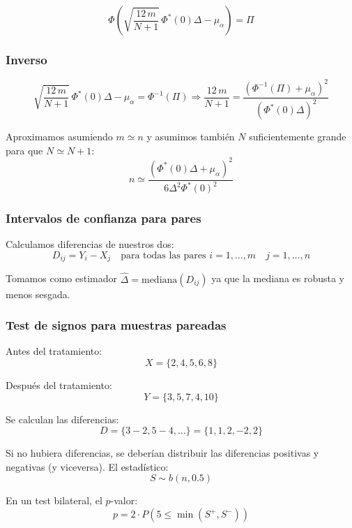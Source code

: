 \[
\Phi\left(\sqrt{\frac{12 \, m}{N+1}} \, \Phi^*(0) \Delta - \mu_\alpha\right) = \Pi
\]

\subsubsection{Inverso}
\[
\sqrt{\frac{12 \, m}{N+1}} \, \Phi^*(0) \Delta - \mu_\alpha = \Phi^{-1}(\Pi)
\Longrightarrow 
\frac{12 \, m}{N+1} = \frac{\left(\Phi^{-1}(\Pi) + \mu_\alpha\right)^2}{\left(\Phi^*(0) \Delta\right)^2}
\]

Aproximamos asumiendo $m \simeq  n$ y asumimos también $N$ suficientemente grande para que $N \simeq N+1$:
\[
n \simeq \frac{\left(\Phi^*(0) \Delta + \mu_\alpha\right)^2}{6 \Delta^2 \Phi^*(0)^2}
\]

\subsubsection{Intervalos de confianza para pares}

Calculamos diferencias de nuestros dos:
\[
D_{ij} = Y_i - X_j \quad \text{para todas las pares } i=1, \dots, m \quad j=1, \dots, n
\]

Tomamos como estimador 
\(
\hat{\Delta} = \text{mediana}(D_{ij})\) ya que la mediana es robusta y menos sesgada.


\subsubsection{Test de signos para muestras pareadas}

Antes del tratamiento:
\[
X = \{2, 4, 5, 6, 8\}
\]

Después del tratamiento:
\[
Y = \{3, 5, 7, 4, 10\}
\]

Se calculan las diferencias:
\[
D = \{3-2, 5-4, \dots\} = \{1, 1, 2, -2, 2\}
\]

Si no hubiera diferencias, se deberían distribuir las diferencias positivas y negativas (y viceversa). El estadístico:
\[
S \sim b(n, 0.5)
\]

En un test bilateral, el $p$-valor:
\[
p = 2 \cdot P(5 \leq \min(S^+, S^-))
\]



















